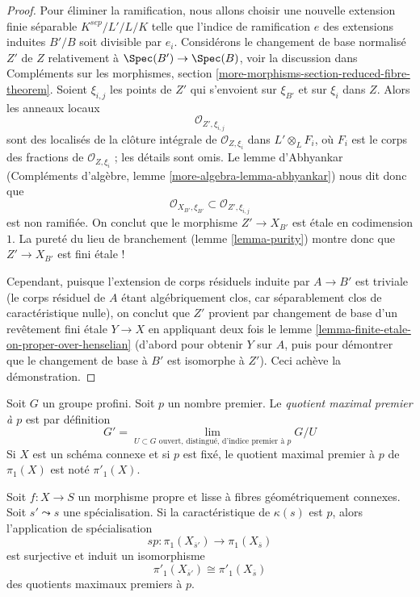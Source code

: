 \begin{proof}
\medskip\noindent
Pour éliminer la ramification, nous allons choisir une nouvelle extension finie
séparable $K^{sep}/L'/L/K$ telle que l'indice de ramification
$e$ des extensions induites $B'/B$ soit divisible par $e_i$.
Considérons le changement de base normalisé $Z'$ de $Z$ relativement à
$\Spec(B') \to \Spec(B)$, voir la discussion dans
Compléments sur les morphismes, section \ref{more-morphisms-section-reduced-fibre-theorem}.
Soient $\xi_{i, j}$ les points de $Z'$ qui s'envoient sur $\xi_{B'}$
et sur $\xi_i$ dans $Z$. Alors les anneaux locaux
$$
\mathcal{O}_{Z', \xi_{i, j}}
$$
sont des localisés de la clôture intégrale de $\mathcal{O}_{Z, \xi_i}$
dans $L' \otimes_L F_i$, où $F_i$ est le corps des fractions de
$\mathcal{O}_{Z, \xi_i}$ ; les détails sont omis. Le lemme d'Abhyankar
(Compléments d'algèbre, lemme \ref{more-algebra-lemma-abhyankar})
nous dit donc que
$$
\mathcal{O}_{X_{B'}, \xi_{B'}} \subset \mathcal{O}_{Z', \xi_{i, j}}
$$
est non ramifiée. On conclut que le morphisme $Z' \to X_{B'}$
est \'etale en codimension $1$. La pureté du
lieu de branchement (lemme \ref{lemma-purity})
montre donc que $Z' \to X_{B'}$ est fini \'etale !

\medskip\noindent
Cependant, puisque l'extension de corps résiduels induite par $A \to B'$
est triviale (le corps résiduel de $A$ étant algébriquement clos,
car séparablement clos de caractéristique nulle),
on conclut que $Z'$ provient par changement de base d'un revêtement fini \'etale
$Y \to X$ en appliquant deux fois le
lemme \ref{lemma-finite-etale-on-proper-over-henselian}
(d'abord pour obtenir $Y$ sur $A$, puis pour démontrer que
le changement de base à $B'$ est isomorphe à $Z'$).
Ceci achève la démonstration.
\end{proof}

\noindent
Soit $G$ un groupe profini. Soit $p$ un nombre premier.
Le {\it quotient maximal premier à $p$} est par définition
$$
G' = \lim_{U \subset G\text{ ouvert, distingué, d'indice premier à }p} G/U
$$
Si $X$ est un schéma connexe et si $p$ est fixé, le quotient maximal
premier à $p$ de $\pi_1(X)$ est noté $\pi'_1(X)$.

\begin{theorem}
\label{theorem-specialization-map-isomorphism-prime-to-p}
Soit $f : X \to S$ un morphisme propre et lisse à fibres géométriquement
connexes. Soit $s' \leadsto s$ une spécialisation.
Si la caractéristique de $\kappa(s)$ est $p$, alors l'application de
spécialisation
$$
sp : \pi_1(X_{\overline{s}'}) \to \pi_1(X_{\overline{s}})
$$
est surjective et induit un isomorphisme
$$
\pi'_1(X_{\overline{s}'}) \cong \pi'_1(X_{\overline{s}})
$$
des quotients maximaux premiers à $p$.
\end{theorem}

